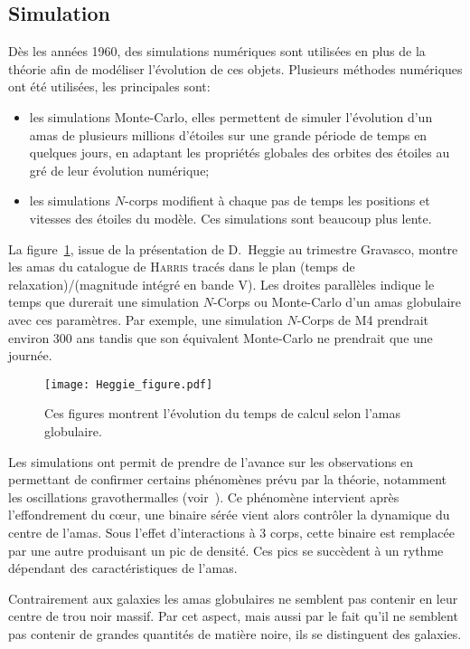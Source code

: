 		\subsection{Simulation}
			Dès les années 1960, des simulations numériques sont utilisées en plus de la
			théorie afin de modéliser l'évolution de ces objets.
			Plusieurs méthodes numériques ont été utilisées, les principales sont:
			\begin{itemize}
					\item les simulations Monte-Carlo, elles permettent de
						simuler l'évolution d'un amas de plusieurs millions
						d'étoiles sur une grande période de temps en quelques
						jours, en adaptant les propriétés globales des
						orbites des étoiles au gré de leur évolution
						numérique;
					\item les simulations $N$-corps modifient à chaque pas de
						temps les positions et vitesses des étoiles du
						modèle.
						Ces simulations sont beaucoup plus lente.
			\end{itemize}
			La figure~\ref{Fig::Intro::HeggieFigure}, issue de la présentation de
			D.~Heggie au trimestre Gravasco, montre les amas du catalogue de
			\textsc{Harris} tracés dans le plan (temps de relaxation)/(magnitude intégré
			en bande V). Les droites parallèles indique le
			temps que durerait une simulation $N$-Corps ou Monte-Carlo d'un amas
			globulaire avec ces paramètres. Par exemple, une simulation $N$-Corps de M4
			prendrait environ 300 ans tandis que son équivalent Monte-Carlo ne prendrait
			que une journée.

			\begin{figure}[h]
				\centering \texttt{[image: Heggie\_figure.pdf]}
				\caption{\label{Fig::Intro::HeggieFigure}Ces figures montrent l'évolution du temps de
				calcul selon l'amas globulaire.}
			\end{figure}

			Les simulations ont permit de prendre de l'avance sur les observations en
			permettant de confirmer certains phénomènes prévu par la théorie, notamment
			les oscillations gravothermalles (voir~\cite{1996ApJ...471..796M}). Ce phénomène
			intervient après l'effondrement du cœur, une binaire sérée vient alors
			contrôler la dynamique du centre de l'amas. Sous l'effet d'interactions à 3
			corps, cette binaire est remplacée par une autre produisant un pic de
			densité. Ces pics se succèdent à un rythme dépendant des caractéristiques de
			l'amas.

			Contrairement aux galaxies les amas globulaires ne semblent pas contenir
			en leur centre de trou noir massif. Par cet aspect, mais
			aussi par le fait qu'il ne semblent pas contenir de grandes quantités de
			matière noire, ils se distinguent des galaxies.

